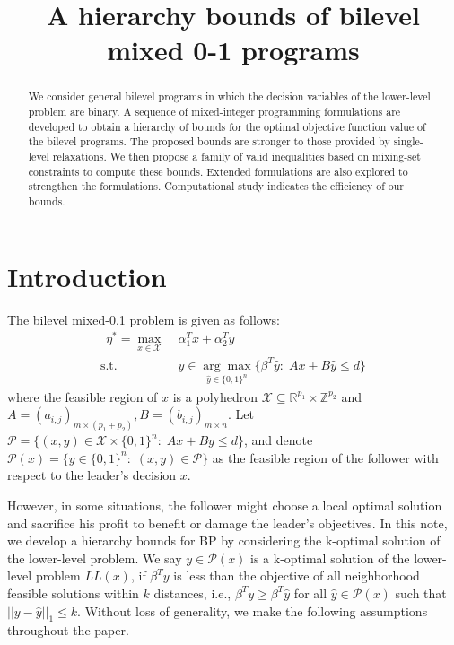 \documentclass[11pt]{article}
\title{A hierarchy bounds of bilevel mixed 0-1 programs}
\newcommand{\RR}{\mathbb{R}}
\newcommand{\ZZ}{\mathbb{Z}}
\newcommand{\X}{\mathcal{X}}
\newcommand{\Pp}{\mathcal{P}}
\begin{document}
\maketitle

\begin{abstract}
	We consider general bilevel programs in which the decision variables of the lower-level problem are binary. A sequence of mixed-integer programming formulations are developed to obtain a hierarchy of bounds for the optimal objective function value of the bilevel programs. The proposed bounds are stronger to those provided by single-level relaxations. We then propose a family of valid inequalities based on mixing-set constraints to compute these bounds. Extended formulations are also explored to strengthen the formulations. Computational study indicates the efficiency of our bounds.
\end{abstract}

\section{Introduction}

The bilevel mixed-0,1 problem is given as follows:
\begin{align*}
[\text{BP}]~~	\eta^* = \max_{x\in \X}\; & \alpha_1^Tx + \alpha_2^Ty \\
	\text{s.t.~~} & y \in \underset{\hat{y}\in \{0,1\}^n}{\arg\max}\{\beta^T\hat{y}:\; Ax + B\hat{y} \leq d\} 
\end{align*}
where the feasible region of $x$ is a polyhedron $\X \subseteq \RR^{p_1} \times \ZZ^{p_2}$ and $A = (a_{i,j})_{m\times (p_1+p_2)}, B = (b_{i,j})_{m\times n}$. Let $\Pp = \{(x, y) \in \X \times \{0,1\}^n:\; Ax + By \leq d \}$, and denote $\Pp(x) = \{y \in \{0, 1\}^n:\; (x, y) \in \Pp \}$ as the feasible region of the follower with respect to the leader's decision $x$.  

However, in some situations, the follower might choose a local optimal solution and sacrifice his profit to benefit or damage the leader's objectives. In this note, we develop a hierarchy bounds for BP by considering the k-optimal solution of the lower-level problem. We say $y \in \Pp(x)$ is a k-optimal solution of the lower-level problem $LL(x)$, if $\beta^Ty$ is less than the objective of all neighborhood feasible solutions within $k$ distances, i.e., $\beta^Ty \geq \beta^T\hat{y}$ for all $\hat{y} \in \Pp(x)$ such that  $||y - \hat{y}||_1 \leq k$. Without loss of generality, we make the following assumptions throughout the paper.
\end{document}
